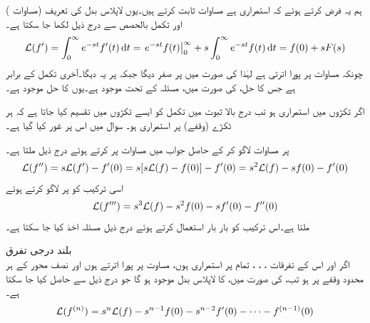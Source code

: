 ہم یہ  فرض کرتے ہوئے  کہ   استمراری ہے مساوات  ثابت کرتے ہیں۔یوں لاپلاس بدل کی تعریف (مساوات ) اور تکمل بالحصص سے درج ذیل لکھا جا سکتا ہے۔
\begin{align*}
\Laplace(f')=\int_{0}^{\infty} e^{-st} f'(t)\dif t=\left. e^{-st} f(t) \right|_{0}^{\infty}+s\int_{0}^{\infty} e^{-st}f(t)\dif t=f(0)+sF(s)
\end{align*}
چونکہ  مساوات  پر پورا اترتی ہے لہٰذا  کی صورت میں   پر صفر دیگا جبکہ  پر یہ  دیگا۔آخری تکمل  کے برابر ہے  جس کا حل،  کی  صورت میں، مسئلہ  کے تحت موجود ہے۔یوں  کا حل موجود ہے۔

اگر  ٹکڑوں میں استمراری ہو تب درج بالا ثبوت میں تکمل کو ایسے ٹکڑوں میں تقسیم کیا جاتا ہے کہ ہر ٹکڑے (وقفے) پر  استمراری ہو۔ سوال  میں اس پر غور کیا گیا ہے۔

 پر مساوات   لاگو کر کے حاصل جواب میں مساوات  پر کرتے ہوئے درج ذیل ملتا ہے۔
\begin{align}\label{مساوات_لاپلاس_درجہ_دوم_تفرق}
\mathcal{L}(f'')=s\mathcal{L}(f')-f'(0)=s[s\mathcal{L}(f)-f(0)]-f'(0)=s^2\mathcal{L}(f)-sf(0)-f'(0)
\end{align}
اسی ترکیب کو  پر لاگو کرتے ہوئے
\begin{align}\label{مساوات_لاپلاس_درجہ_تین_تفرق}
\mathcal{L}(f''')=s^3\mathcal{L}(f)-s^2f(0)-sf'(0)-f''(0)
\end{align}
ملتا ہے۔اس ترکیب کو بار بار استعمال کرتے ہوئے درج ذیل مسئلہ اخذ کیا جا سکتا ہے۔

\quad بلند درجی تفرق \\
اگر  اور اس کے تفرقات ، ، ،   تمام  پر استمراری ہوں، مساوت  پر پورا اترتے ہوں اور  نصف محور  کے ہر محدود وقفے پر  ہو تب،  کی صورت میں،  کا لاپلاس بدل موجود ہو گا جو درج ذیل سے حاصل کیا جا سکتا ہے۔
\begin{align}\label{مساوات_لاپلاس_بلند_درجی_تفرق}
\mathcal{L}(f^{(n)})=s^n\mathcal{L}(f)-s^{n-1}f(0)-s^{n-2}f'(0)-\cdots -f^{(n-1)}(0)
\end{align}

